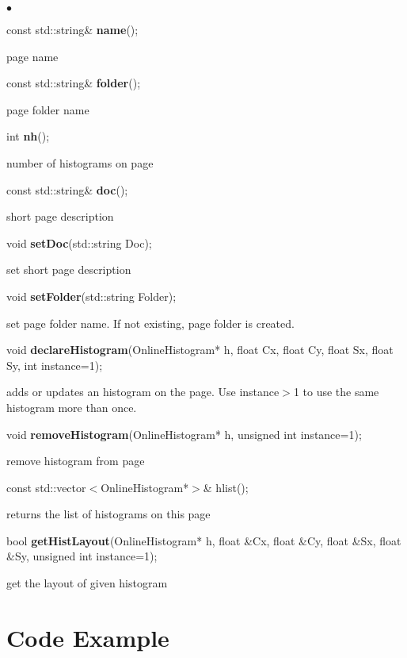 \documentclass{lhcbnote}
\begin{document}
\begin{list}{$\bullet$}{}
\item   const std::string\& {\bf name}();

page name
\item   const std::string\& {\bf folder}();

page folder name
\item   int {\bf nh}();

number of histograms on page
\item   const std::string\& {\bf doc}();

short page description
\item void {\bf setDoc}(std::string Doc);

set short page description
\item   void {\bf setFolder}(std::string Folder);

set page folder name. If not existing, page folder is created.
\item   void {\bf declareHistogram}(OnlineHistogram* h,
		    float Cx,
		    float Cy,
		    float Sx,
		    float Sy,
		    int instance=1);

adds or updates an histogram on the page. Use instance$>$1 to use the
same histogram more than once. 

\item   void {\bf removeHistogram}(OnlineHistogram* h, unsigned int instance=1);

remove histogram from page
\item   const std::vector$<$OnlineHistogram*$>$\& hlist();

returns the list of histograms on this page
\item   bool {\bf getHistLayout}(OnlineHistogram* h,
		     float \&Cx,
		     float \&Cy,
		     float \&Sx,
		     float \&Sy,
		     unsigned int instance=1);


get the layout of given histogram 
\end{list}


\section{Code Example}
\end{document}
